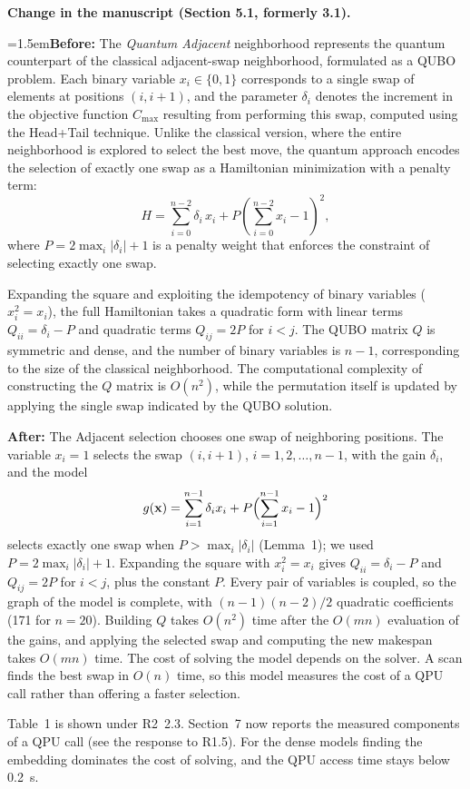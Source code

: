 \documentclass[12pt]{article}
\newcommand{\change}[3]{\par\smallskip\noindent\textbf{Change in the manuscript (#1).}\par
  {\leftskip=1.5em\noindent\textbf{Before:} #2\par\noindent\textbf{After:} #3\par}}
\begin{document}
\change{Section 5.1, formerly 3.1}{The \emph{Quantum Adjacent} neighborhood represents the quantum counterpart of the classical adjacent-swap neighborhood, formulated as a QUBO problem. Each binary variable $x_i \in \{0,1\}$ corresponds to a single swap of elements at positions $(i, i+1)$, and the parameter $\delta_i$ denotes the increment in the objective function $C_{\max}$ resulting from performing this swap, computed using the Head+Tail technique. Unlike the classical version, where the entire neighborhood is explored to select the best move, the quantum approach encodes the selection of exactly one swap as a Hamiltonian minimization with a penalty term:
\begin{equation}
    H = \sum_{i=0}^{n-2} \delta_i\, x_i
        + P \!\left(\sum_{i=0}^{n-2} x_i - 1\right)^{\!2},
\end{equation}
where $P = 2\max_i|\delta_i|+1$ is a penalty weight that enforces the constraint of selecting exactly one swap.

Expanding the square and exploiting the idempotency of binary variables ($x_i^2 = x_i$), the full Hamiltonian takes a quadratic form with linear terms $Q_{ii} = \delta_i - P$ and quadratic terms $Q_{ij} = 2P$ for $i < j$. The QUBO matrix $Q$ is symmetric and dense, and the number of binary variables is $n-1$, corresponding to the size of the classical neighborhood. The computational complexity of constructing the $Q$ matrix is $O(n^2)$, while the permutation itself is updated by applying the single swap indicated by the QUBO solution.}{The Adjacent selection chooses one swap of neighboring positions. The variable $x_i=1$ selects the swap $(i,i+1)$, $i=1,2,\dots,n-1$, with the gain $\delta_i$, and the model
\begin{equation}
g(\mathbf{x})=\sum_{i=1}^{n-1}\delta_ix_i+P\Bigl(\sum_{i=1}^{n-1}x_i-1\Bigr)^2
\end{equation}
selects exactly one swap when $P>\max_i|\delta_i|$ (Lemma~1); we used $P=2\max_i|\delta_i|+1$. Expanding the square with $x_i^2=x_i$ gives $Q_{ii}=\delta_i-P$ and $Q_{ij}=2P$ for $i<j$, plus the constant $P$. Every pair of variables is coupled, so the graph of the model is complete, with $(n-1)(n-2)/2$ quadratic coefficients (171 for $n=20$). Building $Q$ takes $O(n^2)$ time after the $O(mn)$ evaluation of the gains, and applying the selected swap and computing the new makespan takes $O(mn)$ time. The cost of solving the model depends on the solver. A scan finds the best swap in $O(n)$ time, so this model measures the cost of a QPU call rather than offering a faster selection.}
Table~1 is shown under R2~2.3.
Section~7 now reports the measured components of a QPU call (see the response to R1.5). For the dense models finding the embedding dominates the cost of solving, and the QPU access time stays below 0.2~s.
\end{document}
